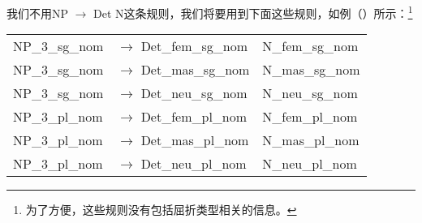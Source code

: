 \zl
我们不用NP $\to$ Det N这条规则，我们将要用到下面这些规则，如例（）所示：\footnote{%
为了方便，这些规则没有包括屈折类型相关的信息。
}  
\ea
\begin{tabular}[t]{@{}l@{ }l@{~~}l}
NP\_3\_sg\_nom  & $\to$ Det\_fem\_sg\_nom & N\_fem\_sg\_nom \\
NP\_3\_sg\_nom  & $\to$ Det\_mas\_sg\_nom & N\_mas\_sg\_nom \\
NP\_3\_sg\_nom  & $\to$ Det\_neu\_sg\_nom & N\_neu\_sg\_nom \\
NP\_3\_pl\_nom  & $\to$ Det\_fem\_pl\_nom & N\_fem\_pl\_nom \\
NP\_3\_pl\_nom  & $\to$ Det\_mas\_pl\_nom & N\_mas\_pl\_nom \\
NP\_3\_pl\_nom  & $\to$ Det\_neu\_pl\_nom & N\_neu\_pl\_nom \\[2mm]
\end{tabular}


